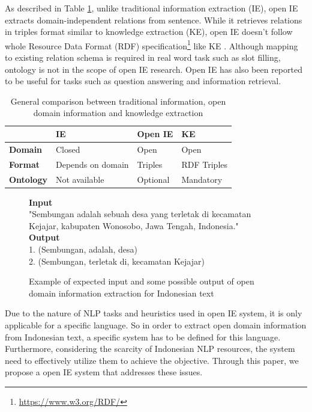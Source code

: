 \documentclass[conference,compsoc]{IEEEtran}
\begin{document}
As described in Table \ref{table_paradigm_comparison}, unlike traditional information extraction (IE), open IE extracts domain-independent relations from sentence. While it retrieves relations in triples format similar to knowledge extraction (KE), open IE doesn't follow whole Resource Data Format (RDF) specification\footnote{\url{https://www.w3.org/RDF/}} like KE\cite{auer2007dbpedia} \cite{exner2014refractive}. Although mapping to existing relation schema is required in real word task such as slot filling\cite{angeli2015leveraging}, ontology is not in the scope of open IE research. Open IE has also been reported to be useful for tasks such as question answering\cite{fader2011identifying} and information retrieval\cite{etzioni2011search}. 

\begin{table}[!t]
\renewcommand{\arraystretch}{1.5}
\caption{General comparison between traditional information, open domain information and knowledge extraction}
\label{table_paradigm_comparison}
\centering
\begin{tabular}{|l|>{\centering\arraybackslash}p{1.5cm}|>{\centering\arraybackslash}p{1.5cm}|>{\centering\arraybackslash}p{1.5cm}|}
\hline 
 & \textbf{IE} & \textbf{Open IE} & \textbf{KE} \\ 
\hline 
\textbf{Domain} & Closed & Open & Open \\ 
\textbf{Format} & Depends on domain & Triples & RDF Triples \\ 
\textbf{Ontology} & Not available & Optional & Mandatory \\ 
\hline 
\end{tabular} 
\end{table}

\begin{figure}
\textbf{Input} \\[0.1cm]
"Sembungan adalah sebuah desa yang terletak di kecamatan Kejajar, kabupaten Wonosobo, Jawa Tengah, Indonesia." \\[0.5cm]
\textbf{Output} \\[0.1cm]
1. (Sembungan, adalah, desa) \\
2. (Sembungan, terletak di, kecamatan Kejajar) \\
\caption{Example of expected input and some possible output of open domain information extraction for Indonesian text}
\label{fig_example_io_openie}
\end{figure}

Due to the nature of NLP tasks and heuristics used in open IE system, it is only applicable for a specific language\cite{banko2007open}. So in order to extract open domain information from Indonesian text, a specific system has to be defined for this language. Furthermore, considering the scarcity of Indonesian NLP resources, the system need to effectively utilize them to achieve the objective. Through this paper, we propose a open IE system that addresses these issues.
\end{document}
